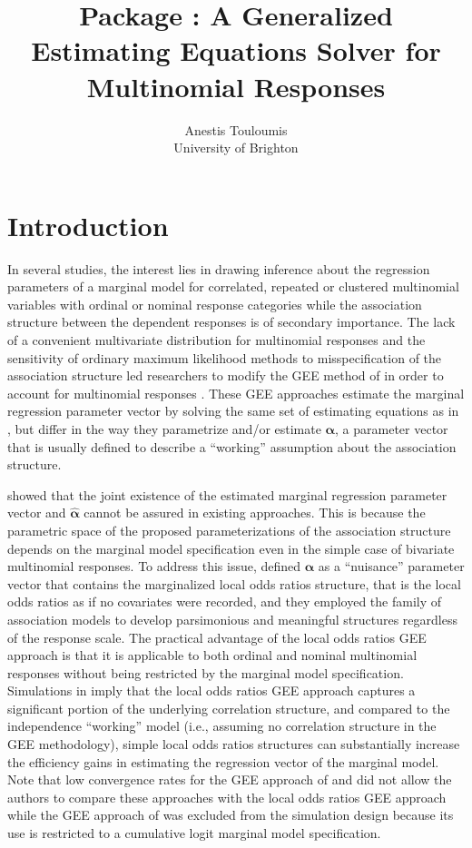 \documentclass[
]{jss}
\author{
Anestis Touloumis\\University of Brighton
}
\title{\proglang{R} Package \pkg{multgee}: A Generalized Estimating Equations
Solver for Multinomial Responses}
\begin{document}
\hypertarget{introduction}{%
\section{Introduction}\label{introduction}}

In several studies, the interest lies in drawing inference about the
regression parameters of a marginal model for correlated, repeated or
clustered multinomial variables with ordinal or nominal response
categories while the association structure between the dependent
responses is of secondary importance. The lack of a convenient
multivariate distribution for multinomial responses and the sensitivity
of ordinary maximum likelihood methods to misspecification of the
association structure led researchers to modify the GEE method of
\citet{Liang1986} in order to account for multinomial responses
\citep{Miller1993, Lipsitz1994, Williamson1995, Lumley1996, Heagerty1996, Parsons2006}.
These GEE approaches estimate the marginal regression parameter vector
by solving the same set of estimating equations as in \citet{Liang1986},
but differ in the way they parametrize and/or estimate
\(\boldsymbol \alpha\), a parameter vector that is usually defined to
describe a ``working'' assumption about the association structure.

\citet{Touloumis2012} showed that the joint existence of the estimated
marginal regression parameter vector and \(\hat{\boldsymbol \alpha}\)
cannot be assured in existing approaches. This is because the parametric
space of the proposed parameterizations of the association structure
depends on the marginal model specification even in the simple case of
bivariate multinomial responses. To address this issue,
\citet{Touloumis2012} defined \(\boldsymbol \alpha\) as a ``nuisance''
parameter vector that contains the marginalized local odds ratios
structure, that is the local odds ratios as if no covariates were
recorded, and they employed the family of association models
\citep{Goodman1985} to develop parsimonious and meaningful structures
regardless of the response scale. The practical advantage of the local
odds ratios GEE approach is that it is applicable to both ordinal and
nominal multinomial responses without being restricted by the marginal
model specification. Simulations in \citet{Touloumis2012} imply that the
local odds ratios GEE approach captures a significant portion of the
underlying correlation structure, and compared to the independence
``working'' model (i.e., assuming no correlation structure in the GEE
methodology), simple local odds ratios structures can substantially
increase the efficiency gains in estimating the regression vector of the
marginal model. Note that low convergence rates for the GEE approach of
\citet{Lipsitz1994} and \citet{Heagerty1996} did not allow the authors
to compare these approaches with the local odds ratios GEE approach
while the GEE approach of \citet{Parsons2006} was excluded from the
simulation design because its use is restricted to a cumulative logit
marginal model specification.
\end{document}

